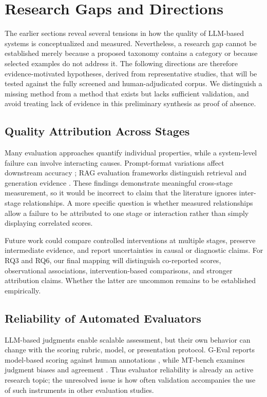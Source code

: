 \section{Research Gaps and Directions}
\label{sec:gaps}

The earlier sections reveal several tensions in how the quality of LLM-based systems is conceptualized and measured. Nevertheless, a research gap cannot be established merely because a proposed taxonomy contains a category or because selected examples do not address it. The following directions are therefore evidence-motivated hypotheses, derived from representative studies, that will be tested against the fully screened and human-adjudicated corpus. We distinguish a missing method from a method that exists but lacks sufficient validation, and avoid treating lack of evidence in this preliminary synthesis as proof of absence.

\subsection{Quality Attribution Across Stages}

Many evaluation approaches quantify individual properties, while a system-level failure can involve interacting causes. Prompt-format variations affect downstream accuracy \cite{sclar2024formatting,chatterjee2024posix}; RAG evaluation frameworks distinguish retrieval and generation evidence \cite{es2024ragas,ru2024ragchecker}. These findings demonstrate meaningful cross-stage measurement, so it would be incorrect to claim that the literature ignores inter-stage relationships. A more specific question is whether measured relationships allow a failure to be attributed to one stage or interaction rather than simply displaying correlated scores.

Future work could compare controlled interventions at multiple stages, preserve intermediate evidence, and report uncertainties in causal or diagnostic claims. For RQ3 and RQ6, our final mapping will distinguish co-reported scores, observational associations, intervention-based comparisons, and stronger attribution claims. Whether the latter are uncommon remains to be established empirically.

\subsection{Reliability of Automated Evaluators}

LLM-based judgments enable scalable assessment, but their own behavior can change with the scoring rubric, model, or presentation protocol. G-Eval reports model-based scoring against human annotations \cite{liu2023geval}, while MT-bench examines judgment biases and agreement \cite{zheng2023mtbench}. Thus evaluator reliability is already an active research topic; the unresolved issue is how often validation accompanies the use of such instruments in other evaluation studies.

